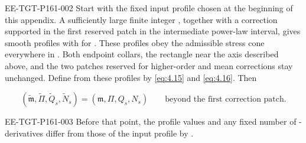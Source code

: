 \begin{proposition}\label{prop:C.2}
\begin{EESegment}{EE-TGT-P161-002}
Start with the fixed input profile  chosen at the beginning of this appendix. A sufficiently large finite integer , together with a correction supported in the first reserved patch in the
intermediate power-law interval, gives smooth profiles  with
 for . These profiles obey
the admissible stress cone everywhere in . Both endpoint collars, the rectangle near the axis
described above, and the two patches reserved for higher-order and mean corrections stay unchanged.
Define  from these profiles by \eqref{eq:4.15} and \eqref{eq:4.16}. Then
\end{EESegment}
\[
 (\widetilde{\mathfrak m},\widetilde\Pi,\widetilde Q_s,\widetilde N_s)
 =(\mathfrak m,\Pi,Q_s,N_s)
 \qquad\text{beyond the first correction patch}.
\]
\begin{EESegment}{EE-TGT-P161-003}
Before that point, the profile values and any fixed number of -derivatives differ from those of the input
profile by .
\end{EESegment}
\end{proposition}

